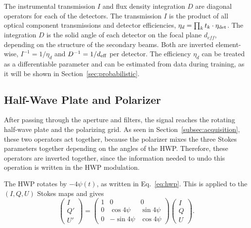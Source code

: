 \documentclass[a4paper,11pt]{article}
\begin{document}
The instrumental transmission $I$ and flux density integration $D$ are diagonal operators for each of the detectors. The transmission $I$ is the product of all optical component transmissions and detector efficiencies, $\eta_d = \prod_k t_k \cdot \eta_{\rm det}$. The integration $D$ is the solid angle of each detector on the focal plane $d_{eff}$, depending on the structure of the secondary beams. Both are inverted element-wise, $I^{-1} = 1/\eta_d$ and $D^{-1} = 1/d_{\rm eff}$ per detector. The efficiency $\eta_d$ can be treated as a differentiable parameter and can be estimated from data during training, as it will be shown in Section~\ref{sec:probabilistic}.

\subsection{Half-Wave Plate and Polarizer}
\label{subsec:polarization}

After passing through the aperture and filters, the signal reaches the rotating half-wave plate and the polarizing grid. As seen in Section~\ref{subsec:acquisition}, these two operators act together, because the polarizer mixes the three Stokes parameters together depending on the angles of the HWP. Therefore, these operators are inverted together, since the information needed to undo this operation is written in the HWP modulation.

The HWP rotates by $-4\psi(t)$, as written in Eq.~\ref{eq:hwp}. This is applied to the $(I, Q, U)$ Stokes maps and gives
\begin{equation}
    \begin{pmatrix} I \\ Q' \\ U' \end{pmatrix}
    =
    \begin{pmatrix} 1 & 0 & 0 \\ 0 & \cos 4\psi & \sin 4\psi \\
    0 & -\sin 4\psi & \cos 4\psi \end{pmatrix}
    \begin{pmatrix} I \\ Q \\ U \end{pmatrix}.
\end{equation}
\end{document}
